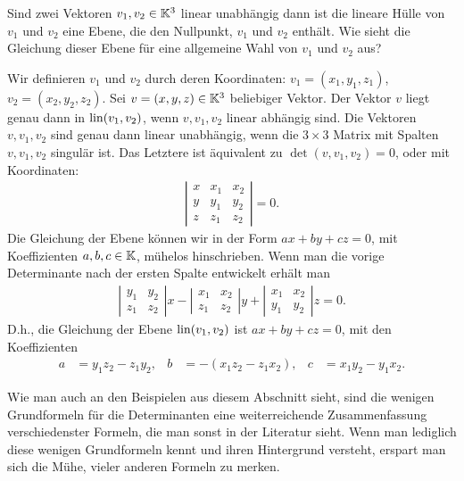 \begin{bsp}
	Sind zwei Vektoren $ v_1, v_2 \in \mathbb K^3 $ linear unabhängig dann ist die lineare Hülle von $v_1$ und $v_2$ eine Ebene, die den Nullpunkt, $v_1$ und $v_2$ enthält. Wie sieht die Gleichung dieser Ebene für eine allgemeine Wahl von $v_1$ und $v_2$ aus?
	
	Wir definieren $v_1$ und $v_2$ durch deren Koordinaten: $ v_1 = (x_1,y_1,z_1) $, $ v_2 = (x_2,y_2,z_2) $. Sei $ v = (x,y,z) \in \mathbb K^3 $ beliebiger Vektor. Der Vektor $v$ liegt genau dann in $\operatorname{lin}(v_1,v_2)$, wenn $v,v_1,v_2$ linear abhängig sind. Die Vektoren $v,v_1,v_2$ sind genau dann linear unabhängig, wenn die $3 \times 3$ Matrix mit Spalten $v,v_1,v_2$ singulär ist. Das Letztere ist äquivalent zu $\det(v,v_1,v_2) = 0$, oder mit Koordinaten: 
	\begin{align*}
				\left| \begin{matrix}
		x & x_1 & x_2 \\
		y & y_1 & y_2 \\
		z & z_1 & z_2
		\end{matrix} \right| = 0.
	\end{align*}
	Die Gleichung der Ebene können wir in der Form $a x + b y + c z =0$, mit Koeffizienten $a,b,c \in \mathbb K$, mühelos hinschrieben. Wenn man die vorige Determinante nach der ersten Spalte entwickelt erhält man
	\begin{align*}
			\left| \begin{matrix}
	y_1 & y_2 \\
	z_1 & z_2
	\end{matrix} \right| x
	- \left| \begin{matrix}
	x_1 & x_2 \\
	z_1 & z_2
	\end{matrix} \right| y
	+ \left| \begin{matrix}
	x_1 & x_2 \\
	y_1 & y_2
	\end{matrix} \right| z = 0.
	\end{align*}
	D.h., die Gleichung der Ebene $\operatorname{lin}(v_1,v_2)$ ist $a x + b y+ c z = 0$, mit den Koeffizienten
	\begin{align*}
		a & = y_1 z_2 - z_1 y_2, &  b&=- (x_1 z_2 - z_1 x_2), & c &= x_1 y_2 - y_1 x_2. 
	\end{align*}
\end{bsp}

Wie man auch an den Beispielen aus diesem Abschnitt sieht, sind die wenigen Grundformeln für die Determinanten eine weiterreichende Zusammenfassung verschiedenster Formeln, die man sonst in der Literatur sieht. Wenn man lediglich diese wenigen Grundformeln kennt und ihren Hintergrund versteht, erspart man sich die Mühe, vieler anderen Formeln zu merken. 

